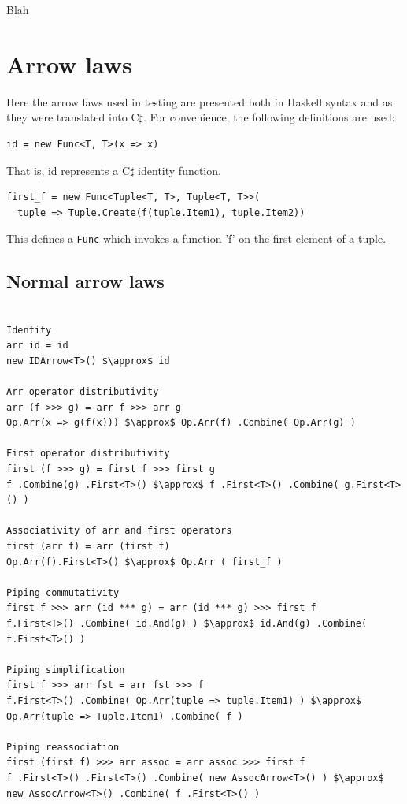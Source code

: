 \documentclass[12pt,twoside,notitlepage]{report}
\begin{document}
Blah

\cleardoublepage



\appendix

\chapter{Arrow laws} \label{sec:arrow_laws}

Here the arrow laws used in testing are presented both in Haskell syntax and as they were translated into C$\sharp$. For convenience, the following definitions are used:

\begin{lstlisting}
id = new Func<T, T>(x => x)
\end{lstlisting}

That is, id represents a C$\sharp$ identity function.

\begin{lstlisting}
first_f = new Func<Tuple<T, T>, Tuple<T, T>>(
  tuple => Tuple.Create(f(tuple.Item1), tuple.Item2))
\end{lstlisting}

This defines a \texttt{Func} which invokes a function 'f' on the first element of a tuple.

\section{Normal arrow laws} \label{sec:simle_arrow_laws}

\begin{samepage}
\begin{lstlisting}[mathescape]

Identity
arr id = id
new IDArrow<T>() $\approx$ id

Arr operator distributivity
arr (f >>> g) = arr f >>> arr g
Op.Arr(x => g(f(x))) $\approx$ Op.Arr(f) .Combine( Op.Arr(g) )

First operator distributivity
first (f >>> g) = first f >>> first g
f .Combine(g) .First<T>() $\approx$ f .First<T>() .Combine( g.First<T>() )

Associativity of arr and first operators
first (arr f) = arr (first f)
Op.Arr(f).First<T>() $\approx$ Op.Arr ( first_f )

Piping commutativity
first f >>> arr (id *** g) = arr (id *** g) >>> first f
f.First<T>() .Combine( id.And(g) ) $\approx$ id.And(g) .Combine( f.First<T>() )

Piping simplification
first f >>> arr fst = arr fst >>> f
f.First<T>() .Combine( Op.Arr(tuple => tuple.Item1) ) $\approx$ Op.Arr(tuple => Tuple.Item1) .Combine( f )

Piping reassociation
first (first f) >>> arr assoc = arr assoc >>> first f
f .First<T>() .First<T>() .Combine( new AssocArrow<T>() ) $\approx$ new AssocArrow<T>() .Combine( f .First<T>() )

\end{lstlisting}
\end{samepage}
\end{document}
